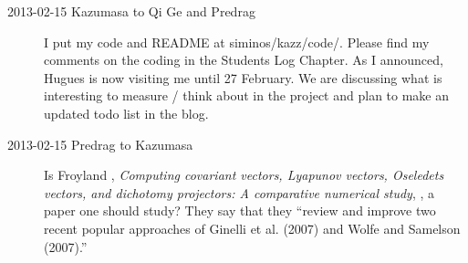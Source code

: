 \begin{description}
\item[2013-02-15 Kazumasa to Qi Ge and Predrag]
I put my code and README at siminos/kazz/code/.
Please find my comments on the coding in the Students Log Chapter.
As I announced, Hugues is now visiting me until 27 February.
We are discussing what is interesting to measure / think about in the project
 and plan to make an updated todo list in the blog.

\item[2013-02-15 Predrag to Kazumasa] Is Froyland
\etal{}, \emph{Computing covariant vectors, {Lyapunov}
vectors, {Oseledets} vectors, and dichotomy projectors: {A}
comparative numerical study}, , a paper one should
study? They say that they ``review and improve two recent popular
approaches of Ginelli et al. (2007) and Wolfe and
Samelson (2007).''



\end{description}

\renewcommand{\ssp}{a}

